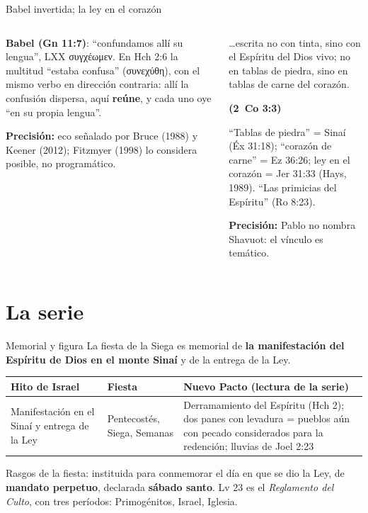 \documentclass[hyperref={bookmarks=false},aspectratio=169]{beamer}
\newcommand{\grc}[1]{\foreignlanguage{ancientgreek}{#1}}
\newcommand{\fuente}[1]{\par\hfill{\upshape\bfseries\footnotesize\textcolor{tierraroja}{#1}}}
\newcommand{\destacar}[1]{\textbf{\textcolor{tierraroja}{#1}}}
\newcommand{\precision}[1]{{\footnotesize\color{sepia}\textbf{Precisión:} #1}}
\begin{document}
\begin{frame}{Babel invertida; la ley en el corazón}
\begin{columns}[t,onlytextwidth]
\begin{column}{0.48\textwidth}\small\RaggedRight
\textbf{Babel (Gn 11:7)}: ``confundamos allí su lengua'', LXX \grc{συγχέωμεν}. En Hch 2:6 la multitud ``estaba confusa'' (\grc{συνεχύθη}), con el mismo verbo en dirección contraria: allí la confusión dispersa, aquí \destacar{reúne}, y cada uno oye ``en su propia lengua''.\par\smallskip
\precision{eco señalado por Bruce (1988) y Keener (2012); Fitzmyer (1998) lo considera posible, no programático.}
\end{column}
\begin{column}{0.50\textwidth}
\begin{cita}\ldots{}escrita no con tinta, sino con el Espíritu del Dios vivo; no en tablas de piedra, sino en tablas de carne del corazón.\fuente{(2~Co 3:3)}\end{cita}
\scriptsize\RaggedRight ``Tablas de piedra'' = Sinaí (Éx 31:18); ``corazón de carne'' = Ez 36:26; ley en el corazón = Jer 31:33 (Hays, 1989). ``Las primicias del Espíritu'' (Ro 8:23).\par
\precision{Pablo no nombra Shavuot: el vínculo es temático.}
\end{column}
\end{columns}
\end{frame}

\section{La serie}

\begin{frame}{Memorial y figura}
\small\RaggedRight La fiesta de la Siega es memorial de \destacar{la manifestación del Espíritu de Dios en el monte Sinaí} y de la entrega de la Ley.\par\smallskip
\scriptsize\renewcommand{\arraystretch}{1.15}
\begin{tabular}{@{}L{3.0cm}L{2.3cm}L{6.6cm}@{}}
\toprule
\textbf{Hito de Israel} & \textbf{Fiesta} & \textbf{Nuevo Pacto (lectura de la serie)} \\ \midrule
Manifestación en el Sinaí y entrega de la Ley & Pentecostés, Siega, Semanas & Derramamiento del Espíritu (Hch 2); dos panes con levadura = pueblos aún con pecado considerados para la redención; lluvias de Joel 2:23 \\
\bottomrule
\end{tabular}\par\medskip
\small\RaggedRight Rasgos de la fiesta: instituida para conmemorar el día en que se dio la Ley, de \destacar{mandato perpetuo}, declarada \destacar{sábado santo}. Lv 23 es el \emph{Reglamento del Culto}, con tres períodos: Primogénitos, Israel, Iglesia.
\end{frame}
\end{document}
